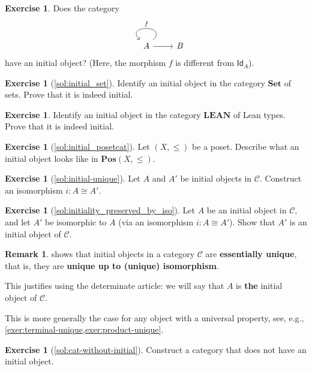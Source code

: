 \documentclass[a4paper,10pt]{scrartcl}
\theoremstyle{plain}
\theoremstyle{definition}
\newtheorem{rem}[thm]{Remark}
\newtheorem{exer}[thm]{Exercise}
\newcommand{\cfont}[1]{\ensuremath{\mathsf{#1}}}
\newcommand{\Cat}[1]{\mathcal{#1}}
\newcommand{\CC}{\Cat{C}}
\newcommand{\Catb}[1]{\mathbf{#1}}
\newcommand{\SET}{\Catb{Set}}
\newcommand{\POS}{\Catb{Pos}}
\newcommand{\LEAN}{\Catb{LEAN}}
\newcommand{\Id}[1][]{\cfont{Id}_{#1}}
\begin{document}
\begin{exer}
  Does the category 
  \[
  \begin{tikzcd}
  A \arrow[r] \arrow[loop, swap, looseness=4, "f"] & B
  \end{tikzcd}
  \]
  have an initial object? (Here, the morphism $f$ is different from $\Id[A]$).
\end{exer}

\begin{exer}[\cref{sol:initial_set}]\label{exer:initial_set}
  Identify an initial object in the category $\SET$ of sets.
  Prove that it is indeed initial.
\end{exer}

\begin{exer}
  Identify an initial object in the category $\LEAN$ of Lean types.
  Prove that it is indeed initial.
\end{exer}

\begin{exer}[\cref{sol:initial_posetcat}]\label{exer:initial_posetcat}
  Let $(X,\leq)$ be a poset. Describe what an initial object looks like in  $\POS(X,\leq)$.
\end{exer}

\begin{exer}[\cref{sol:initial-unique}]\label{exer:initial-unique}
  Let $A$ and $A'$ be initial objects in $\CC$. Construct an isomorphism $i : A \cong A'$.
\end{exer}

\begin{exer}[\cref{sol:initiality_preserved_by_iso}]\label{exer:initiality_preserved_by_iso}
  Let $A$ be an initial object in $\CC$, and let $A'$ be isomorphic to $A$ (via an isomorphism $i : A \cong A'$).
  Show that $A'$ is an initial object of $\CC$.
\end{exer}

\begin{rem}
   shows that initial objects in a category $\CC$ are \textbf{essentially unique}, that is, they are \textbf{unique up to (unique) isomorphism}.

  
  This justifies using the determinate article: we will say that $A$ is \textbf{the} initial object of $\CC$.

  
  This is more generally the case for any object with a universal property, see, e.g., \cref{exer:terminal-unique,exer:product-unique}.
\end{rem}

\begin{exer}[\cref{sol:cat-without-initial}]\label{exer:cat-without-initial}
  Construct a category that does not have an initial object.
\end{exer}
\end{document}
